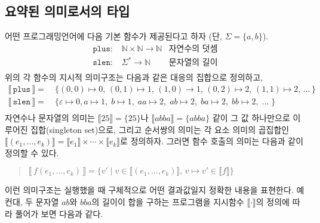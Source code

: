 \subsection{요약된 의미로서의 타입}\label{sec:TypeAsAbsSem}
어떤 프로그래밍언어에 다음 기본 함수가 제공된다고 하자 (단, $\Sigma=\{a,b\}$).
\vspace{-1.5ex}
\begin{align*}
\texttt{plus} :\; & \mathbb{N} \times \mathbb{N} \to \mathbb{N} & \text{자연수의 덧셈}\\
\texttt{slen} :\; & \Sigma^{*} \to \mathbb{N} & \text{문자열의 길이}\\[-5.5ex]
\end{align*}
위의 각 함수의 지시적 의미구조는 다음과 같은 대응의 집합으로 정의하고,\vspace*{-1.5ex}
\begin{align*}
 \llbracket\,\texttt{plus}\,\rrbracket
 =~& \{ (0,0)\mapsto 0,\,
        (0,1)\mapsto 1,\,(1,0)\to 1,\,
        (0,2)\mapsto 2,\,(1,1)\mapsto 2,\,
        \ldots\,
     \}
 \\
 \llbracket\,\texttt{slen}\,\rrbracket
 =~& \{ \varepsilon\mapsto 0, 
        a\mapsto 1,\;b\mapsto 1,\;
        aa\mapsto 2,\;ab\mapsto 2,\;ba\mapsto 2,\;bb\mapsto 2,\;
        \ldots\;
     \} \\[-5.5ex]
\end{align*}
자연수나 문자열의 의미는
$\llbracket 25 \rrbracket = \{25\}$나 $\llbracket abba \rrbracket = \{abba\}$ 같이
그 값 하나만으로 이루어진 집합(singleton set)으로, 그리고 순서쌍의 의미는
각 요소 의미의 곱집합인
$\llbracket(e_1,\ldots,e_k)\rrbracket =
 \llbracket e_1\rrbracket\times\cdots\times\llbracket e_k\rrbracket$로 정의하자.
그러면 함수 호출의 의미는 다음과 같이 정의할 수 있다.\vspace*{-1ex}
\begin{quote}
$ \llbracket\,f(e_1,\ldots,e_k)\,\rrbracket
 = \{ v' \mid v \in \llbracket (e_1,\ldots,e_k)\rrbracket,\,
              v\mapsto v' \in \llbracket f\rrbracket \} $
\end{quote}
이런 의미구조는 실행했을 때 구체적으로 어떤 결과값일지 정확한 내용을
표현한다. 예컨대, 두 문자열 $ab$와 $bba$의 길이이 합을 구하는 프로그램을
지시함수 $\llbracket\cdot\rrbracket$의 정의에 따라 풀어가 보면 다음과 같다.
\vspace*{-1.5ex}
